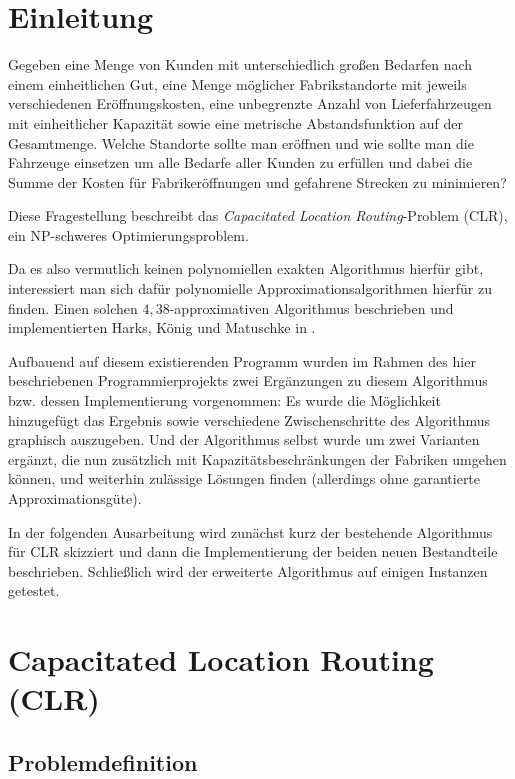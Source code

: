 \documentclass[a4paper,ngerman,11pt,bibtotoc]{scrartcl}
\theoremstyle{definition}
\theoremstyle{plain}
\theoremstyle{remark}
\newcommand{\CLR}{CLR}
\begin{document}


\tableofcontents

\newpage
	
\section*{Einleitung}

Gegeben eine Menge von Kunden mit unterschiedlich großen Bedarfen nach einem einheitlichen Gut, eine Menge möglicher Fabrikstandorte mit jeweils verschiedenen Eröffnungskosten, eine unbegrenzte Anzahl von Lieferfahrzeugen mit einheitlicher Kapazität sowie eine metrische Abstandsfunktion auf der Gesamtmenge. Welche Standorte sollte man eröffnen und wie sollte man die Fahrzeuge einsetzen um alle Bedarfe aller Kunden zu erfüllen und dabei die Summe der Kosten für Fabrikeröffnungen und gefahrene Strecken zu minimieren?

Diese Fragestellung beschreibt das \emph{Capacitated Location Routing}-Problem (\CLR), ein NP-schweres Optimierungsproblem.

Da es also vermutlich keinen polynomiellen exakten Algorithmus hierfür gibt, interessiert man sich dafür polynomielle Approximationsalgorithmen hierfür zu finden. Einen solchen $4,38$-approximativen Algorithmus beschrieben und implementierten Harks, König und Matuschke in \cite{AAfCLR}. 

Aufbauend auf diesem existierenden Programm wurden im Rahmen des hier beschriebenen Programmierprojekts zwei Ergänzungen zu diesem Algorithmus bzw. dessen Implementierung vorgenommen: Es wurde die Möglichkeit hinzugefügt das Ergebnis sowie verschiedene Zwischenschritte des Algorithmus graphisch auszugeben. Und der Algorithmus selbst wurde um zwei Varianten ergänzt, die nun zusätzlich mit Kapazitätsbeschränkungen der Fabriken umgehen können, und weiterhin zulässige Lösungen finden (allerdings ohne garantierte Approximationsgüte).

In der folgenden Ausarbeitung wird zunächst kurz der bestehende Algorithmus für \CLR{} skizziert und dann die Implementierung der beiden neuen Bestandteile beschrieben. Schließlich wird der erweiterte Algorithmus auf einigen Instanzen getestet.


\section{Capacitated Location Routing (\CLR)}

	\subsection{Problemdefinition}
\end{document}
